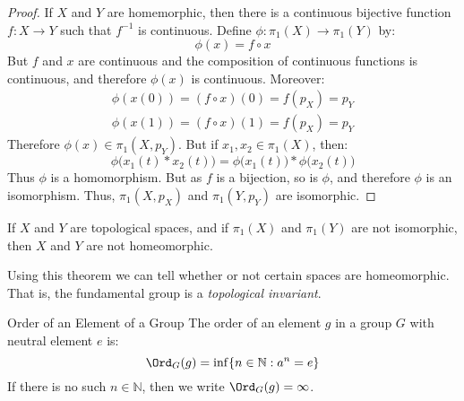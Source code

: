 \documentclass[crop=false,class=book,oneside]{standalone}
\begin{document}
            \begin{proof}
                If $X$ and $Y$ are homemorphic, then there is
                a continuous bijective function
                $f:X\rightarrow{Y}$ such that
                $f^{-1}$ is continuous. Define
                $\phi:\pi_{1}(X)\rightarrow\pi_{1}(Y)$ by:
                \begin{equation}
                    \phi(x)=f\circ{x}
                \end{equation}
                But $f$ and $x$ are continuous and the composition
                of continuous functions is continuous, and therefore
                $\phi(x)$ is continuous. Moreover:
                \begin{align}
                    \phi(x(0))=(f\circ{x})(0)=f(p_{X})=p_{Y}\\
                    \phi(x(1))=(f\circ{x})(1)=f(p_{X})=p_{Y}
                \end{align}
                Therefore $\phi(x)\in\pi_{1}(X,p_{Y})$.
                But if $x_{1},x_{2}\in\pi_{1}(X)$, then:
                \begin{equation}
                    \phi\big(x_{1}(t)*x_{2}(t)\big)
                    =\phi\big(x_{1}(t)\big)*\phi\big(x_{2}(t)\big)
                \end{equation}
                Thus
                $\phi$ is a homomorphism. But as
                $f$ is a bijection, so is $\phi$, and
                therefore $\phi$ is an isomorphism.
                Thus, $\pi_{1}(X,p_{X})$ and
                $\pi_{1}(Y,p_{Y})$ are isomorphic.
            \end{proof}
            \begin{theorem}
                If $X$ and $Y$ are topological spaces,
                and if $\pi_{1}(X)$ and $\pi_{1}(Y)$
                are not isomorphic, then
                $X$ and $Y$ are not homeomorphic.
            \end{theorem}
            Using this theorem we can tell whether or not
            certain spaces are homeomorphic. That is,
            the fundamental group is a
            \textit{topological invariant}.
            \begin{ldefinition}{Order of an Element of a Group}
                The order of an element $g$ in a group $G$
                with neutral element $e$ is:
                \begin{equation}
                    \Ord_{G}(g)=\inf\{n\in\mathbb{N}:a^{n}=e\}
                \end{equation}
                If there is no such $n\in\mathbb{N}$, then we write
                $\Ord_{G}(g)=\infty$.
            \end{ldefinition}
\end{document}
